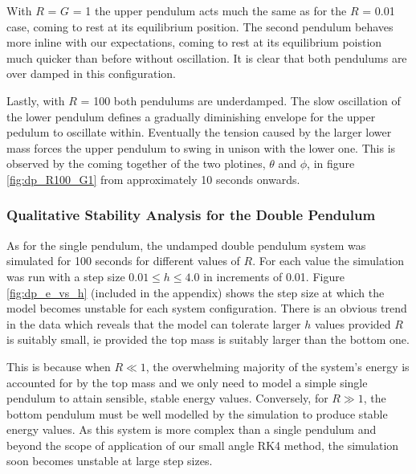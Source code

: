 \documentclass[11pt]{article}
\begin{document}
With $R$ = $G$ = 1 the upper pendulum acts much the same as for the $R$ = 0.01 case, coming to rest at its equilibrium position. The second pendulum behaves more inline with our expectations, coming to rest at its equilibrium poistion much quicker than before without oscillation. It is clear that both pendulums are over damped in this configuration.

Lastly, with $R$ = 100 both pendulums are underdamped. The slow oscillation of the lower pendulum defines a gradually diminishing envelope for the upper pedulum to oscillate within. Eventually the tension caused by the larger lower mass forces the upper pendulum to swing in unison with the lower one. This is observed by the coming together of the two plotines, $\theta$ and $\phi$, in figure \ref{fig:dp_R100_G1} from approximately 10 seconds onwards.

\subsubsection*{Qualitative Stability Analysis for the Double Pendulum}
As for the single pendulum, the undamped double pendulum system was simulated for 100 seconds for different values of $R$. For each value the simulation was run with a step size $0.01 \leq h \leq 4.0$ in increments of 0.01. Figure \ref{fig:dp_e_vs_h} (included in the appendix) shows the step size at which the model becomes unstable for each system configuration. There is an obvious trend in the data which reveals that the model can tolerate larger $h$ values provided $R$ is suitably small, ie provided the top mass is suitably larger than the bottom one.

This is because when $R \ll 1$, the overwhelming majority of the system's energy is accounted for by the top mass and we only need to model a simple single pendulum to attain sensible, stable energy values. Conversely, for $R \gg 1$, the bottom pendulum must be well modelled by the simulation to produce stable energy values. As this system is more complex than a single pendulum and beyond the scope of application of our small angle RK4 method, the simulation soon becomes unstable at large step sizes.
\end{document}
